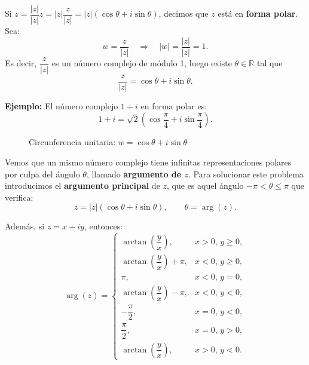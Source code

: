 \documentclass[a4paper,12pt]{article}
\begin{document}
Si $z = \dfrac{|z|}{|z|}z = |z|\dfrac{z}{|z|} = |z|(\cos\theta + i\sin\theta)$,  
decimos que $z$ está en \textbf{forma polar}.\\

Sea:
\[
w = \frac{z}{|z|} \quad \Rightarrow \quad |w| = \frac{|z|}{|z|} = 1.
\]
Es decir, $\dfrac{z}{|z|}$ es un número complejo de módulo 1, luego existe $\theta \in \mathbb{R}$ tal que
\[
\frac{z}{|z|} = \cos\theta + i\sin\theta.
\]

\noindent\textbf{Ejemplo:} El número complejo $1+i$ en forma polar es:
\[
1+i = \sqrt{2}\left(\cos\frac{\pi}{4} + i\sin\frac{\pi}{4}\right).
\]

\begin{figure}[h]
\centering
{}

\medskip
{\small Circunferencia unitaria: \(w=\cos\theta+i\sin\theta\)}
\end{figure}

Vemos que un mismo número complejo tiene infinitas representaciones polares por culpa del ángulo $\theta$, llamado \textbf{argumento de $z$}.  
Para solucionar este problema introducimos el \textbf{argumento principal} de $z$, que es aquel ángulo $-\pi < \theta \leq \pi$ que verifica:
\[
z = |z|(\cos\theta + i\sin\theta), \qquad \theta = \arg(z).
\]

Además, si $z = x+iy$, entonces:
\[
\arg(z) =
\begin{cases}
\arctan\!\left(\dfrac{y}{x}\right), & x > 0, \, y \geq 0, \\[1ex]
\arctan\!\left(\dfrac{y}{x}\right)+\pi, & x < 0, \, y \geq 0, \\[1ex]
\pi, & x < 0, \, y = 0, \\[1ex]
\arctan\!\left(\dfrac{y}{x}\right)-\pi, & x < 0, \, y < 0, \\[1ex]
-\dfrac{\pi}{2}, & x = 0, \, y < 0, \\[1ex]
\dfrac{\pi}{2}, & x = 0, \, y > 0, \\[1ex]
\arctan\!\left(\dfrac{y}{x}\right), & x > 0, \, y < 0.
\end{cases}
\]
\end{document}
